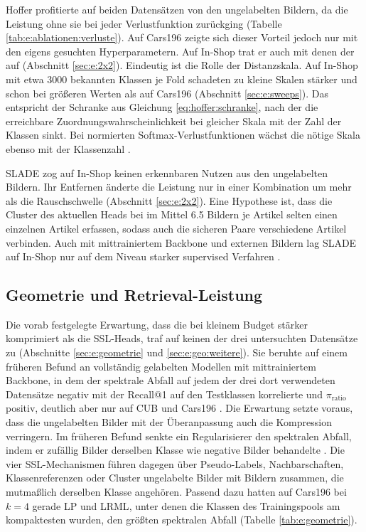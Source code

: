 Hoffer profitierte auf beiden Datensätzen von den ungelabelten Bildern, da die Leistung ohne sie bei jeder Verlustfunktion zurückging (Tabelle \ref{tab:e:ablationen:verluste}). Auf Cars196 zeigte sich dieser Vorteil jedoch nur mit den eigens gesuchten Hyperparametern. Auf In-Shop trat er auch mit denen der \UEBL auf (Abschnitt \ref{sec:e:2x2}). Eindeutig ist die Rolle der Distanzskala. Auf In-Shop mit etwa \num{3000} bekannten Klassen je Fold schadeten zu kleine Skalen stärker und schon bei größeren Werten als auf Cars196 (Abschnitt \ref{sec:e:sweeps}). Das entspricht der Schranke aus Gleichung \eqref{eq:hoffer:schranke}, nach der die erreichbare Zuordnungswahrscheinlichkeit bei gleicher Skala mit der Zahl der Klassen sinkt. Bei normierten Softmax-Verlustfunktionen wächst die nötige Skala ebenso mit der Klassenzahl \cite{wang_normface_2017}. 

\ac{SLADE} zog auf In-Shop keinen erkennbaren Nutzen aus den ungelabelten Bildern. Ihr Entfernen änderte die Leistung nur in einer Kombination um mehr als die Rauschschwelle (Abschnitt \ref{sec:e:2x2}). Eine Hypothese ist, dass die Cluster des aktuellen Heads bei im Mittel \num{6.5} Bildern je Artikel selten einen einzelnen Artikel erfassen, sodass auch die sicheren Paare verschiedene Artikel verbinden. Auch mit mittrainiertem Backbone und externen Bildern lag \ac{SLADE} auf In-Shop nur auf dem Niveau starker supervised Verfahren \cite{duan_slade_2021}. 

\subsection{Geometrie und Retrieval-Leistung}
\label{sec:d:ablationen}

Die vorab festgelegte Erwartung, dass die \UEBL bei kleinem Budget stärker komprimiert als die \ac{SSL}-Heads, traf auf keinen der drei untersuchten Datensätze zu (Abschnitte \ref{sec:e:geometrie} und \ref{sec:e:geo:weitere}). Sie beruhte auf einem früheren Befund an vollständig gelabelten Modellen mit mittrainiertem Backbone, in dem der spektrale Abfall auf jedem der drei dort verwendeten Datensätze negativ mit der Recall@1 auf den Testklassen korrelierte und $\pi_{\mathrm{ratio}}$ positiv, deutlich aber nur auf \ac{CUB} und Cars196 \cite{roth_revisiting_2020}. Die Erwartung setzte voraus, dass die ungelabelten Bilder mit der Überanpassung auch die Kompression verringern. Im früheren Befund senkte ein Regularisierer den spektralen Abfall, indem er zufällig Bilder derselben Klasse wie negative Bilder behandelte \cite{roth_revisiting_2020}. Die vier \ac{SSL}-Mechanismen führen dagegen über Pseudo-Labels, Nachbarschaften, Klassenreferenzen oder Cluster ungelabelte Bilder mit Bildern zusammen, die mutmaßlich derselben Klasse angehören. Passend dazu hatten auf Cars196 bei $k=4$ gerade \ac{LP} und \ac{LRML}, unter denen die Klassen des Trainingspools am kompaktesten wurden, den größten spektralen Abfall (Tabelle \ref{tab:e:geometrie}).

